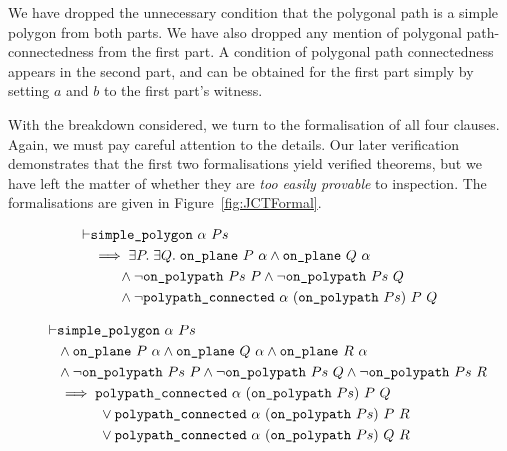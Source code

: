 We have dropped the unnecessary condition that the polygonal path is a simple polygon from both parts. We have also dropped any mention of polygonal path-connectedness from the first part. A condition of polygonal path connectedness appears in the second part, and can be obtained for the first part simply by setting $a$ and $b$ to the first part's witness.

With the breakdown considered, we turn to the formalisation of all four clauses. Again, we must pay careful attention to the details. Our later verification demonstrates that the first two formalisations yield verified theorems, but we have left the matter of whether they are \emph{too easily provable} to inspection. The formalisations are given in Figure~\ref{fig:JCTFormal}.

\begin{figure}
\begin{equation}\label{eq:jordanFormal1}
  \begin{split}
\vdash &\code{simple\_polygon}\ \alpha\ Ps\\
       &\implies \exists P.\;\exists Q.\; \code{on\_plane}\ P\ \alpha \wedge \code{on\_plane}\ Q\ \alpha\\
       &\qquad\wedge \neg\code{on\_polypath}\ Ps\ P \wedge \neg\code{on\_polypath}\ Ps\ Q\\
       &\qquad\wedge \neg\code{polypath\_connected}\ \alpha\ (\code{on\_polypath}\ Ps)\ P\ Q
  \end{split}
\end{equation}

\begin{equation}\label{eq:jordanFormal2}
  \begin{split}
\vdash &\code{simple\_polygon}\ \alpha\ Ps\\
       &\wedge \code{on\_plane}\ P\ \alpha \wedge \code{on\_plane}\ Q\ \alpha \wedge \code{on\_plane}\ R\ \alpha\\
       &\wedge \neg\code{on\_polypath}\ Ps\ P\wedge \neg\code{on\_polypath}\ Ps\ Q\wedge \neg\code{on\_polypath}\ Ps\ R\\
       &\implies \code{polypath\_connected}\ \alpha\ (\code{on\_polypath}\ Ps)\ P\ Q\\
       &\qquad\quad\vee \code{polypath\_connected}\ \alpha\ (\code{on\_polypath}\ Ps)\ P\ R\\
       &\qquad\quad\vee \code{polypath\_connected}\ \alpha\ (\code{on\_polypath}\ Ps)\ Q\ R
     \end{split}
\end{equation}


\end{figure}

